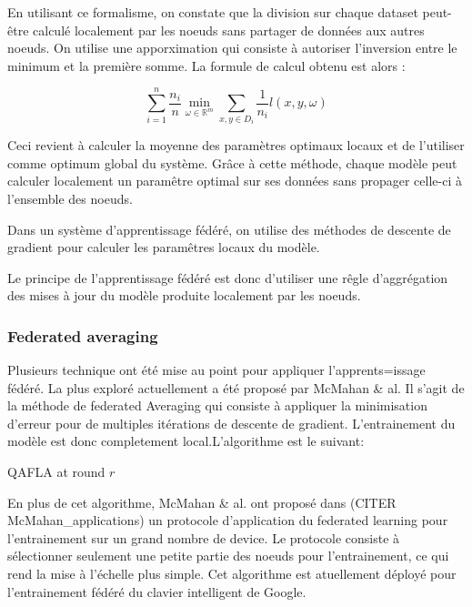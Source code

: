 \documentclass[stage3a]{tnreport} %
\begin{document}
En utilisant ce formalisme, on constate que la division sur chaque dataset peut-être calculé localement par les noeuds sans partager de données aux autres noeuds. On utilise une apporximation qui consiste à autoriser l'inversion entre le minimum et la première somme. La formule de calcul obtenu est alors :

\begin{equation}
  \sum_{i = 1}^n \frac{n_i}{n} \min_{\omega \in \mathbb{R}^m} \sum_{x,y \in D_i}\frac{1}{n_i}l(x,y,\omega) 
\end{equation}

Ceci revient à calculer la moyenne des paramètres optimaux locaux et de l'utiliser comme optimum global du système. Grâce à cette méthode, chaque modèle peut calculer localement un paramêtre optimal sur ses données sans propager celle-ci à l'ensemble des noeuds. 

Dans un système d'apprentissage fédéré, on utilise des méthodes de descente de gradient pour calculer les paramêtres locaux du modèle.

Le principe de l'apprentissage fédéré est donc d'utiliser une rêgle d'aggrégation des mises à jour du modèle produite localement par les noeuds.

\subsubsection{Federated averaging}

Plusieurs technique ont été mise au point pour appliquer l'apprents=issage fédéré. La plus exploré actuellement a été proposé par McMahan \& al. Il s'agit de la méthode de federated Averaging qui consiste à appliquer la minimisation d'erreur pour de multiples itérations de descente de gradient. L'entrainement du modèle est donc completement local.L'algorithme est le suivant:

\begin{algorithm}[h]
  \caption{QAFLA at round $r$}
  
 
\end{algorithm}

En plus de cet algorithme, McMahan \& al. ont proposé dans (CITER McMahan\_applications) un protocole d'application du federated learning pour l'entrainement sur un grand nombre de device. Le protocole consiste à sélectionner seulement une petite partie des noeuds pour l'entrainement, ce qui rend la mise à l'échelle plus simple. Cet algorithme est atuellement déployé pour l'entrainement fédéré du clavier intelligent de Google.
\end{document}
